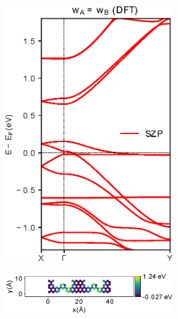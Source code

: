 \begin{figure}[h]
	\centering
	\begin{subfigure}[b]{0.3\textwidth}
		\centering
		\includegraphics[width=0.8\textwidth]{Figures/MS2ODFT.eps}
		\vspace{-1\baselineskip}
		\caption{}
		\label{MS2ODFT}
	\end{subfigure}
	\hspace{20pt}
	\begin{subfigure}[b]{0.3\textwidth}
		\centering
		\includegraphics[width=0.8\textwidth]{Figures/MS2O.eps}
		\vspace{-2\baselineskip}
		\caption{}
		\label{MS2Odevnomod}
	\end{subfigure}
	~
	\begin{subfigure}[b]{0.3\textwidth}
		\centering

\end{subfigure}
\end{figure}
